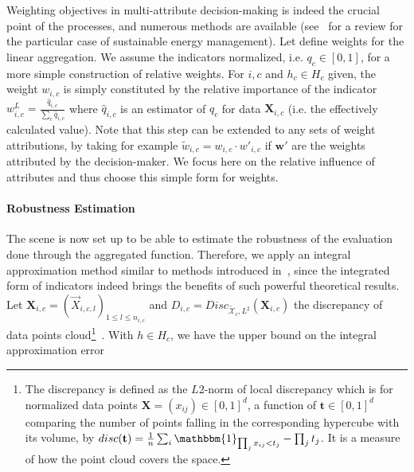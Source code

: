 \documentclass[runningheads,a4paper]{llncs2e/llncs}
\begin{document}
Weighting objectives in multi-attribute decision-making is indeed the crucial point of the processes, and numerous methods are available (see~\cite{wang2009review} for a review for the particular case of sustainable energy management). Let define weights for the linear aggregation. We assume the indicators normalized, i.e. $q_c \in [0,1]$, for a more simple construction of relative weights. For $i,c$ and $h_{c}\in H_{c}$ given, the weight $w_{i,c}$ is simply constituted by the relative importance of the indicator $w_{i,c}^{L}=\frac{\hat{q}_{i,c}}{\sum_{c}\hat{q}_{i,c}}$ where $\hat{q}_{i,c}$ is an estimator of $q_{c}$ for data $\mathbf{X}_{i,c}$ (i.e. the effectively calculated value). Note that this step can be extended to any sets of weight attributions, by taking for example $\tilde{w}_{i,c} = w_{i,c} \cdot w'_{i,c}$ if $\mathbf{w}'$ are the weights attributed by the decision-maker. We focus here on the relative influence of attributes and thus choose this simple form for weights.










\paragraph{Robustness Estimation}

The scene is now set up to be able to estimate the robustness of the evaluation done through the aggregated function. Therefore, we apply an integral approximation method similar to methods introduced in~\cite{varet2010developpement}, since the integrated form of indicators indeed brings the benefits of such powerful theoretical results. Let $\mathbf{X}_{i,c}=(\vec{X}_{i,c,l})_{1\leq l\leq n_{i,c}}$ and $D_{i,c}=Disc_{\tilde{\mathcal{X}}_{c},L^2}(\mathbf{X}_{i,c})$ the discrepancy of data points cloud\footnote{The discrepancy is defined as the $L2$-norm of local discrepancy which is for normalized data points $\mathbf{X}=(x_{ij})\in \left[0,1\right]^d$, a function of $\mathbf{t}\in \left[0,1\right]^d$ comparing the number of points falling in the corresponding hypercube with its volume, by $disc(\mathbf{t}) = \frac{1}{n}\sum_i \mathbbm{1}_{\prod_j x_{ij}<t_j} - \prod_j t_j$. It is a measure of how the point cloud covers the space.}~\cite{niederreiter1972discrepancy}. With $h\in H_{c}$, we have the upper bound on the integral approximation error
\end{document}
